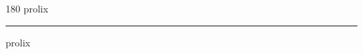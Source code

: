 
\begin{frame}
\begin{center}
\begin{turn}{180}
{\fontsize{2.5cm}{1em}\selectfont prolix}
\end{turn}
\vspace{1em}\par  
\hrule
\vspace{1em}\par  
{\fontsize{2.5cm}{1em}\selectfont prolix}
\end{center}
\end{frame}
